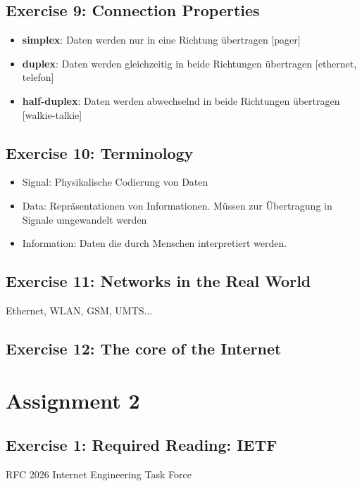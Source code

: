 \documentclass[10pt,a4paper]{scrartcl}
\begin{document}
\subsection*{Exercise 9: Connection Properties}
\begin{itemize}
\item \textbf{simplex}: Daten werden nur in eine Richtung übertragen [pager]
\item \textbf{duplex}: Daten werden gleichzeitig in beide Richtungen übertragen [ethernet, telefon]
\item \textbf{half-duplex}: Daten werden abwechselnd in beide Richtungen übertragen [walkie-talkie]
\end{itemize}

\subsection*{Exercise 10: Terminology}
\begin{itemize}
\item Signal: Physikalische Codierung von Daten
\item Data: Repräsentationen von Informationen. Müssen zur Übertragung in Signale umgewandelt werden
\item Information: Daten die durch Menschen interpretiert werden. 
\end{itemize}

\subsection*{Exercise 11: Networks in the Real World}
Ethernet, WLAN, GSM, UMTS...

\subsection*{Exercise 12: The core of the Internet}

\section*{Assignment 2}

\subsection*{Exercise 1: Required Reading: IETF}
RFC 2026 Internet Engineering Task Force
\end{document}
